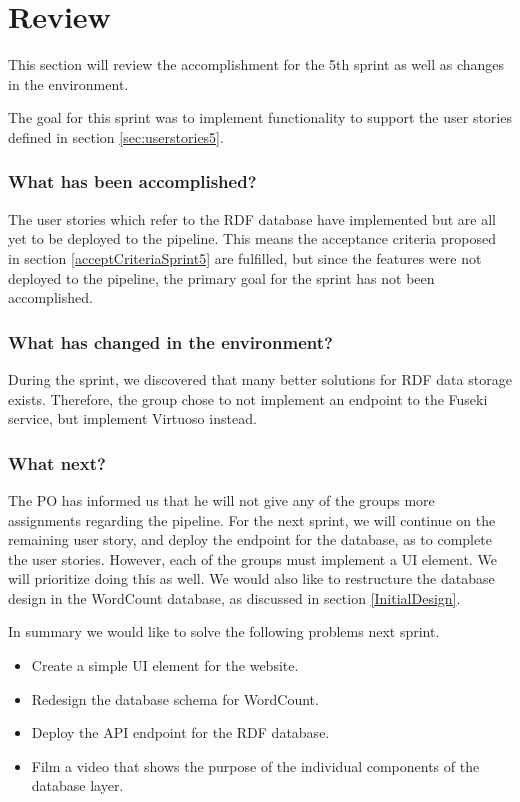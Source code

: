\section{Review}
This section will review the accomplishment for the 5th sprint as well as changes in the \knox{} environment. 

The goal for this sprint was to implement functionality to support the user stories defined in section \ref{sec:userstories5}. 

\subsubsection*{What has been accomplished?}
The user stories which refer to the RDF database have implemented but are all yet to be deployed to the \knox{} pipeline. This means the acceptance criteria proposed in section \ref{acceptCriteriaSprint5} are fulfilled, but since the features were not deployed to the pipeline, the primary goal for the sprint has not been accomplished. 

\subsubsection*{What has changed in the environment?}
During the sprint, we discovered that many better solutions for RDF data storage exists. Therefore, the group chose to not implement an endpoint to the Fuseki service, but implement Virtuoso instead. 

\subsubsection*{What next?}
The PO has informed us that he will not give any of the \knox{} groups more assignments regarding the pipeline. 
For the next sprint, we will continue on the remaining user story, and deploy the endpoint for the database, as to complete the user stories. 
However, each of the \knox{} groups must implement a UI element. We will prioritize doing this as well.
We would also like to restructure the database design in the WordCount database, as discussed in section \ref{InitialDesign}.


In summary we would like to solve the following problems next sprint.

\begin{itemize}
    \item Create a simple UI element for the \knox{} website.
    \item Redesign the database schema for WordCount.
    \item Deploy the API endpoint for the RDF database.
    \item Film a video that shows the purpose of the individual components of the database layer.
\end{itemize}
